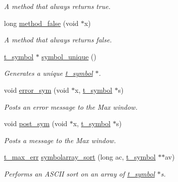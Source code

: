 \begin{DoxyCompactItemize}
\begin{DoxyCompactList}\small\item\em A method that always returns true. \item\end{DoxyCompactList}\item 
\hypertarget{group__misc_gaaedbb45cad3ac00f027d06e738181bd7}{
long \hyperlink{group__misc_gaaedbb45cad3ac00f027d06e738181bd7}{method\_\-false} (void $\ast$x)}
\label{group__misc_gaaedbb45cad3ac00f027d06e738181bd7}

\begin{DoxyCompactList}\small\item\em A method that always returns false. \item\end{DoxyCompactList}\item 
\hyperlink{structt__symbol}{t\_\-symbol} $\ast$ \hyperlink{group__misc_ga0cb594bfc861d0a72b61c067cd890122}{symbol\_\-unique} ()
\begin{DoxyCompactList}\small\item\em Generates a unique \hyperlink{structt__symbol}{t\_\-symbol} $\ast$. \item\end{DoxyCompactList}\item 
void \hyperlink{group__misc_ga0a094decd1408632226438943e55de81}{error\_\-sym} (void $\ast$x, \hyperlink{structt__symbol}{t\_\-symbol} $\ast$s)
\begin{DoxyCompactList}\small\item\em Posts an error message to the Max window. \item\end{DoxyCompactList}\item 
void \hyperlink{group__misc_gad8bf1a07113f7db2b387d5e138fe59fd}{post\_\-sym} (void $\ast$x, \hyperlink{structt__symbol}{t\_\-symbol} $\ast$s)
\begin{DoxyCompactList}\small\item\em Posts a message to the Max window. \item\end{DoxyCompactList}\item 
\hyperlink{group__datatypes_ga73edaae82b318855cc09fac994918165}{t\_\-max\_\-err} \hyperlink{group__misc_ga751e472fea0842d902012a41f79afcce}{symbolarray\_\-sort} (long ac, \hyperlink{structt__symbol}{t\_\-symbol} $\ast$$\ast$av)
\begin{DoxyCompactList}\small\item\em Performs an ASCII sort on an array of \hyperlink{structt__symbol}{t\_\-symbol} $\ast$s. \item\end{DoxyCompactList}\item 
$$
\end{DoxyCompactItemize}
